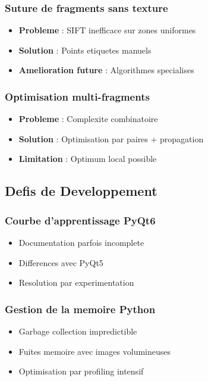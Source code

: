 \documentclass[12pt,a4paper]{article}
\begin{document}
\subsubsection{Suture de fragments sans texture}
\begin{itemize}
\item \textbf{Probleme} : SIFT inefficace sur zones uniformes
\item \textbf{Solution} : Points etiquetes manuels
\item \textbf{Amelioration future} : Algorithmes specialises
\end{itemize}

\subsubsection{Optimisation multi-fragments}
\begin{itemize}
\item \textbf{Probleme} : Complexite combinatoire
\item \textbf{Solution} : Optimisation par paires + propagation
\item \textbf{Limitation} : Optimum local possible
\end{itemize}

\subsection{Defis de Developpement}

\subsubsection{Courbe d'apprentissage PyQt6}
\begin{itemize}
\item Documentation parfois incomplete
\item Differences avec PyQt5
\item Resolution par experimentation
\end{itemize}

\subsubsection{Gestion de la memoire Python}
\begin{itemize}
\item Garbage collection impredictible
\item Fuites memoire avec images volumineuses
\item Optimisation par profiling intensif
\end{itemize}
\end{document}
